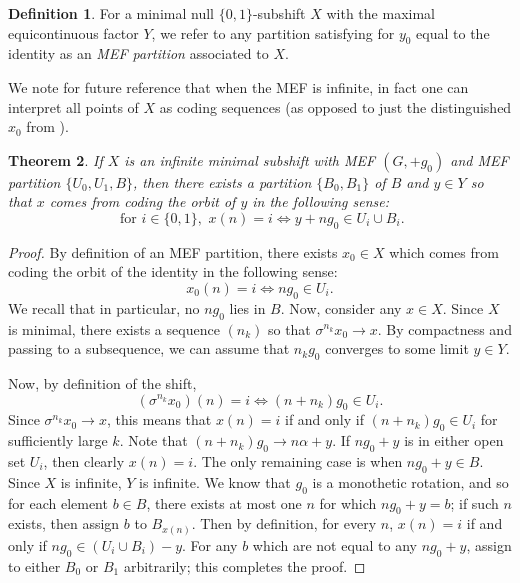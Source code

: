 \documentclass[11pt,reqno]{amsart}
\newtheorem{theorem}{Theorem}[section]
\theoremstyle{definition}
\newtheorem{definition}[theorem]{Definition}
\theoremstyle{plain}
\newcommand{\AuthornoteA}[2]{{\sf\small\color{magenta}{[#1: #2]}}}
\newcommand{\AuthornoteR}[2]{{\sf\small\color{blue}{[#1: #2]}}}
\newcommand{\Anote}{\AuthornoteA{A}}
\newcommand{\rp}{\AuthornoteR{R}}
\begin{document}
\begin{definition}
For a minimal null $\{0,1\}$-subshift $X$ with the maximal equicontinuous factor $Y$, we refer to any partition satisfying  for $y_0$ equal to the identity as an \emph{MEF partition} associated to $X$.

\end{definition}

We note for future reference that when the MEF is infinite, in fact one can interpret all points of $X$ as coding sequences (as opposed to just the distinguished $x_0$ from ).

\begin{theorem}\label{gencoding}
    If $X$ is an infinite minimal subshift with MEF $(G, +g_0)$ and MEF partition $\{U_0, U_1, B\}$, 
    then there exists a partition $\{B_0, B_1\}$ of $B$ and $y \in Y$ so that $x$ comes from coding the orbit of $y$ in the following sense:
\[
    \text{ for } i \in \{0, 1\}, \, \, x(n) = i \Longleftrightarrow y + ng_0 \in U_i \cup B_i.
\]
\end{theorem}


\begin{proof}
    By definition of an MEF partition, there exists $x_0 \in X$ which comes from coding the orbit of the identity in the following sense: 
    \[
    x_0(n) = i \Longleftrightarrow ng_0 \in U_i.
    \]
We recall that in particular, no $ng_0$ lies in $B$. Now, consider any $x \in X$. Since $X$ is minimal, there exists a sequence $(n_k)$ so that $\sigma^{n_k} x_0 \rightarrow x$. By compactness and passing to a subsequence, we can assume that $n_{k} g_0$ converges to some limit $y \in Y$. 

Now, by definition of the shift,
\[
(\sigma^{n_k} x_0)(n) = i \Longleftrightarrow (n + n_k) g_0 \in U_i.
\]
Since $\sigma^{n_k} x_0 \rightarrow x$, this means that $x(n) = i$ if and only if $(n + n_k) g_0 \in U_i$ for sufficiently large $k$. Note that $(n + n_k) g_0 \rightarrow n\alpha + y$. If $ng_0 + y$ is in either open set $U_i$, then clearly $x(n) = i$. The only remaining case is when $ng_0 + y \in B$. Since $X$ is infinite, $Y$ is infinite. We know that $g_0$ is a monothetic rotation, and so for each element $b \in B$, there exists at most one $n$ for which $n g_0 + y = b$; if such $n$ exists, then assign 
$b$ to $B_{x(n)}$. Then by definition, for every $n$, $x(n) = i$ if and only if $ng_0 \in (U_i \cup B_i) - y$. For any $b$ which are not equal to any $ng_0 + y$, assign to either $B_0$ or $B_1$ arbitrarily; this completes the proof.

\end{proof}
\end{document}
